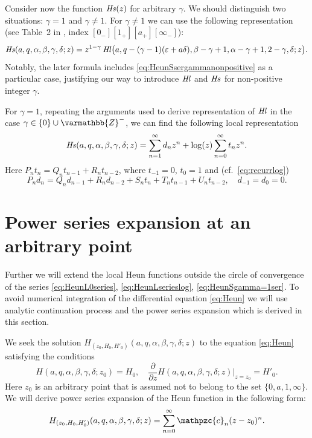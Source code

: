 \documentclass[11pt]{article}
\newcommand{\MF}[1]{\mathop{#1}\nolimits}
\newcommand{\Zz}{\varmathbb{Z}}%
\def\Heun{H}%
\def\HeunL{\MF{\textit{Hl\/}}}%
\def\HeunS{\MF{\textit{Hs\/}}}%
\def\car{\mathpzc{c}}
\begin{document}
Consider now the function $\HeunS(z)$ for arbitrary $\gamma$. We
should distinguish two situations: $\gamma=1$ and $\gamma\neq1$. For
$\gamma\neq1$ we can use the following representation (see Table~2 in
\cite{192-Maier2007}, index $[0_-][1_+][a_+][\infty_-]$):
\begin{equation}
 \HeunS(a,q,\alpha,\beta,\gamma,\delta;z) = z^{1-\gamma}\HeunL\bigl(a,q-(\gamma-1)(\varepsilon+a\delta),
 \beta-\gamma+1,\alpha-\gamma+1,2-\gamma,\delta;z\bigr).
\label{eq:HeunSgammaneq1}
\end{equation}
Notably, the later formula includes \eqref{eq:HeunSsergammanonpositive} as a
particular case, justifying our way to introduce $\HeunL$ and $\HeunS$ for
non-positive integer $\gamma$.

For $\gamma=1$, repeating the arguments used to derive representation of
$\HeunL$ in the case $\gamma\in\{0\}\cup\Zz^-$, we can find the following local
representation
\begin{equation}
\HeunS(a,q,\alpha,\beta,\gamma,\delta;z)=\sum_{n=1}^{\infty}d_n z^n
+\log(z)\sum_{n=0}^{\infty}t_n z^n.
\label{eq:HeunSgamma=1ser}
\end{equation}
Here $P_n t_n=Q_n t_{n-1}+R_n t_{n-2}$, where $t_{-1}=0$, $t_{0}=1$ and (cf.\
\eqref{eq:recurrlog})
\begin{equation*}
P_n d_n=Q_n d_{n-1}+R_n d_{n-2}+ S_n t_{n}+T_n t_{n-1}+U_n t_{n-2},\quad
d_{-1}=d_0=0.
\end{equation*}

\section{Power series expansion at an arbitrary point}
\label{sect:expatarbpt}

Further we will extend the local Heun functions outside the circle of
convergence of the series \eqref{eq:HeunL0series}, \eqref{eq:HeunLserieslog},
\eqref{eq:HeunSgamma=1ser}. To avoid numerical integration of the differential
equation \eqref{eq:Heun} we will use analytic continuation process and the power
series expansion which is derived in this section.

We seek the solution $\Heun_{(z_0,H_0,H'_0)}(a,q,\alpha,\beta,\gamma,\delta;z)$
to the equation \eqref{eq:Heun} satisfying the conditions
\begin{equation}
 \Heun(a,q,\alpha,\beta,\gamma,\delta;z_0)=H_0,\quad
 \frac{\partial}{\partial z}\Heun(a,q,\alpha,\beta,\gamma,\delta;z)\Bigr|_{z=z_0}=H'_0.
\label{eq:z0H0H'0}
\end{equation}
Here $z_0$ is an arbitrary point that is assumed not to belong to the set
$\{0,a,1,\infty\}$. We will derive power series expansion of the Heun function in
the following form:
\begin{equation}
\Heun_{(z_0,H_0,H'_0)}(a,q,\alpha,\beta,\gamma,\delta;z)=\sum_{n=0}^{\infty}\car_n(z-z_0)^n.
\label{eq:HeunZ0series}
\end{equation}   
\end{document}

